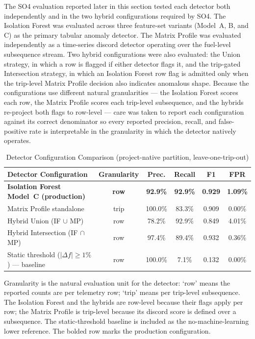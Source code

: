 The SO4 evaluation reported later in this section tested each detector both independently and in the two hybrid configurations required by SO4. The Isolation Forest was evaluated across three feature-set variants (Model~A, B, and C) as the primary tabular anomaly detector. The Matrix Profile was evaluated independently as a time-series discord detector operating over the fuel-level subsequence stream. Two hybrid configurations were also evaluated: the Union strategy, in which a row is flagged if either detector flags it, and the trip-gated Intersection strategy, in which an Isolation Forest row flag is admitted only when the trip-level Matrix Profile decision also indicates anomalous shape. Because the configurations use different natural granularities --- the Isolation Forest scores each row, the Matrix Profile scores each trip-level subsequence, and the hybrids re-project both flags to row-level --- care was taken to report each configuration against its correct denominator so every reported precision, recall, and false-positive rate is interpretable in the granularity in which the detector natively operates.

\begin{table}[!htbp]
\centering
\caption{Detector Configuration Comparison (project-native partition, leave-one-trip-out)}
\label{tab:so4_config_compare}
\scriptsize
\setlength{\tabcolsep}{3pt}
\begin{tabular}{|p{}|c|c|c|c|c|}
\hline
\textbf{Detector Configuration} & \textbf{Granularity} & \textbf{Prec.} & \textbf{Recall} & \textbf{F1} & \textbf{FPR} \\
\hline
\textbf{Isolation Forest Model~C (production)} & \textbf{row} & \textbf{92.9\%} & \textbf{92.9\%} & \textbf{0.929} & \textbf{1.09\%} \\
\hline
Matrix Profile standalone & trip & 100.0\% & 83.3\% & 0.909 & 0.00\% \\
\hline
Hybrid Union (IF $\cup$ MP) & row & 78.2\% & 92.9\% & 0.849 & 4.01\% \\
\hline
Hybrid Intersection (IF $\cap$ MP) & row & 97.4\% & 89.4\% & 0.932 & 0.36\% \\
\hline
Static threshold ($|\Delta f| \geq 1\%$) --- baseline & row & 100.0\% & 7.1\% & 0.132 & 0.00\% \\
\hline
\end{tabular}
\normalsize
\end{table}

\noindent
Granularity is the natural evaluation unit for the detector: `row' means the reported counts are per telemetry row; `trip' means per trip-level subsequence. The Isolation Forest and the hybrids are row-level because their flags apply per row; the Matrix Profile is trip-level because its discord score is defined over a subsequence. The static-threshold baseline is included as the no-machine-learning lower reference. The bolded row marks the production configuration.

